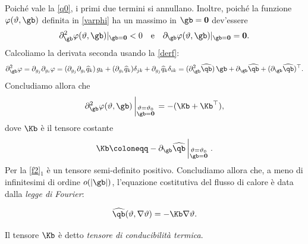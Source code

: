 Poiché vale la \eqref{q0}, i primi due termini si annullano. Inoltre, poiché la funzione $\varphi (\vartheta, \gb)$ definita in  \eqref{varphi} ha un massimo in $\gb=\mathbf{0}$ dev'essere
\begin{equation}\label{f2}
\partial_\gb^2\varphi(\vartheta, \gb)|_{\gb=\mathbf{0}}<0 \quad \textrm{e} \quad \partial_\gb\varphi(\vartheta, \gb)|_{\gb=\mathbf{0}}=\mathbf{0}.
\end{equation}
Calcoliamo la derivata seconda usando la \eqref{derf}:
\begin{equation}
\partial^2_\gb\varphi=\partial_{g_j}\partial_{g_i}\varphi=(\partial_{g_j}\partial_{g_i}\widehat{q}_k)\, g_k+(\partial_{g_i}\widehat{q}_k)\delta_{jk}+\partial_{g_j}\widehat{q}_k\delta_{ik}=(\partial^2_{\gb}\widehat{\qb})\,\gb
+\partial_\gb\widehat{\qb}+(\partial_\gb\widehat{\qb})^\top.
\end{equation}
Concludiamo allora che
\begin{equation}
\partial^2_\gb\varphi(\vartheta,\gb)\left|_{\substack{ \vartheta=\vartheta_0\\ \gb=\mathbf{0}  }}\right.=-(\Kb +\Kb^\top),
\end{equation}
dove $\mathbf{\Kb}$ è il tensore costante
\begin{equation}
\Kb \coloneqq -\partial_\gb\widehat{\qb}\left|_{\substack{ \vartheta=\vartheta_0\\ \gb=\mathbf{0}  }}\right..
\end{equation}
Per la \eqref{f2}$_{1}$ è un tensore semi-definito positivo. Concludiamo allora che, a meno di infinitesimi di ordine $o(|\gb|)$, l'equazione costitutiva del flusso di calore è data dalla \textit{legge di Fourier}:
\begin{definition}
\begin{equation}
	\widehat{\qb}(\vartheta, \nabla\vartheta)=-\Kb\nabla \vartheta.
\end{equation}
\end{definition}
Il tensore $\Kb$ è detto \textit{tensore di conducibilità termica}.







